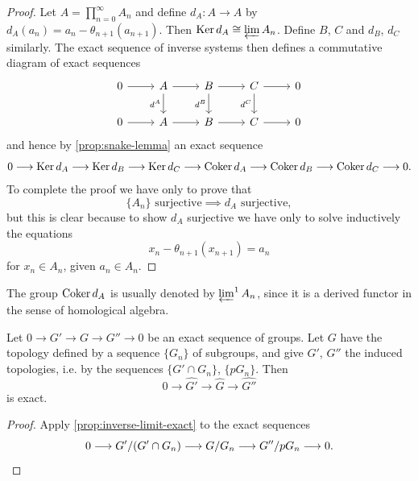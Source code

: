 \begin{proof}
Let $A = \prod_{n=0}^\infty A_n$ and define $d_A \colon A \to A$ by $d_A(a_n) = a_n - \theta_{n+1}(a_{n+1})$. Then $\operatorname{Ker} d_A \cong \varprojlim A_n$. Define $B$, $C$ and $d_B$, $d_C$ similarly. The exact sequence of inverse systems then defines a commutative diagram of exact sequences
\[\begin{tikzcd}
	0 & A & B & C & 0 \\
	0 & A & B & C & 0
	\arrow[from=1-1, to=1-2]
	\arrow[from=1-2, to=1-3]
	\arrow["{d^A}"', from=1-2, to=2-2]
	\arrow[from=1-3, to=1-4]
	\arrow["{d^B}"', from=1-3, to=2-3]
	\arrow[from=1-4, to=1-5]
	\arrow["{d^C}"', from=1-4, to=2-4]
	\arrow[from=2-1, to=2-2]
	\arrow[from=2-2, to=2-3]
	\arrow[from=2-3, to=2-4]
	\arrow[from=2-4, to=2-5]
\end{tikzcd}\]
and hence by \eqref{prop:snake-lemma} an exact sequence
\[
    0 \longrightarrow \operatorname{Ker} d_A \longrightarrow \operatorname{Ker} d_B \longrightarrow \operatorname{Ker} d_C \longrightarrow \operatorname{Coker} d_A \longrightarrow \operatorname{Coker} d_B \longrightarrow \operatorname{Coker} d_C \longrightarrow 0.
\]
To complete the proof we have only to prove that
\[
    \{A_n\} \text{ surjective} \implies d_A \text{ surjective},
\]
but this is clear because to show $d_A$ surjective we have only to solve inductively the equations
\[
    x_n - \theta_{n+1}(x_{n+1}) = a_n
\]
for $x_n \in A_n$, given $a_n \in A_n$.
\end{proof}

\begin{remark}
The group $\operatorname{Coker} d_A$ is usually denoted by $\varprojlim^1 A_n$, since it is a derived functor in the sense of homological algebra.
\end{remark}

\begin{corollary}\label{cor:completion-exact}
Let $0 \longrightarrow G' \longrightarrow G \longrightarrow G'' \longrightarrow 0$ be an exact sequence of groups. Let $G$ have the topology defined by a sequence $\{G_n\}$ of subgroups, and give $G'$, $G''$ the induced topologies, i.e. by the sequences $\{G' \cap G_n\}$, $\{pG_n\}$. Then
\[
    0 \longrightarrow \widehat{G'} \longrightarrow \widehat{G} \longrightarrow \widehat{G''}
\]
is exact.
\end{corollary}

\begin{proof}
Apply \eqref{prop:inverse-limit-exact} to the exact sequences
\[
    0 \longrightarrow G'/(G' \cap G_n) \longrightarrow G/G_n \longrightarrow G''/pG_n \longrightarrow 0. \qedhere
\]
\end{proof}


